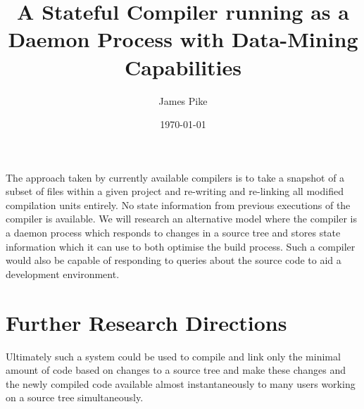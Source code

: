 \documentclass{article}
\begin{document}
\title{A Stateful Compiler running as a Daemon Process with Data-Mining Capabilities}
\author{James Pike}
\date{\today}

\maketitle

The approach taken by currently available compilers is to take a snapshot
of a subset of files within a given project and re-writing and re-linking all
modified compilation units entirely. No state information from previous
executions of the compiler is available. We will research an alternative 
model where the compiler is a daemon process which responds to changes in a
source tree and stores state information which it can use to both optimise the 
build process. Such a compiler would also be capable of responding to queries
about the source code to aid a development environment.

\section*{Further Research Directions}

Ultimately such a system could be used to compile and link only the minimal 
amount of code based on changes to a source tree and make these changes and 
the newly compiled code available almost instantaneously to many users 
working on a source tree simultaneously.

% 
% 
\end{document}
